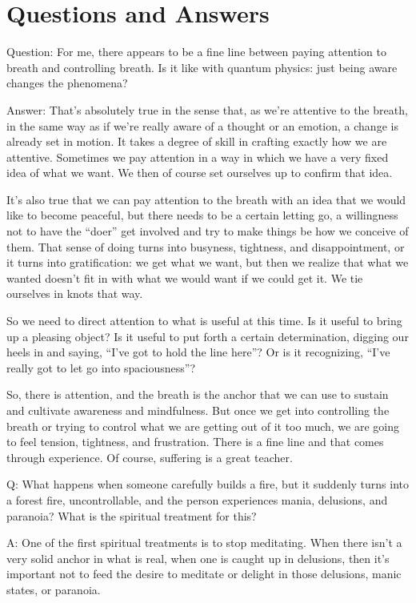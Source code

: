 \chapter{Questions and Answers}

\qaspace
Question: For me, there appears to be a fine line between paying
attention to breath and controlling breath. Is it like with quantum
physics: just being aware changes the phenomena?

\qaspace
Answer: That’s absolutely true in the sense that, as we’re attentive to
the breath, in the same way as if we’re really aware of a thought or an
emotion, a change is already set in motion. It takes a degree of skill
in crafting exactly how we are attentive. Sometimes we pay attention in
a way in which we have a very fixed idea of what we want. We then of
course set ourselves up to confirm that idea.

It’s also true that we can pay attention to the breath with an idea that
we would like to become peaceful, but there needs to be a certain
letting go, a willingness not to have the “doer” get involved and try to
make things be how we conceive of them. That sense of doing turns into
busyness, tightness, and disappointment, or it turns into gratification:
we get what we want, but then we realize that what we wanted doesn’t fit
in with what we would want if we could get it. We tie ourselves in knots
that way.

So we need to direct attention to what is useful at this time. Is it
useful to bring up a pleasing object? Is it useful to put forth a
certain determination, digging our heels in and saying, “I’ve got to
hold the line here”? Or is it recognizing, “I’ve really got to let go
into spaciousness”?

So, there is attention, and the breath is the anchor that we can use to
sustain and cultivate awareness and mindfulness. But once we get into
controlling the breath or trying to control what we are getting out of
it too much, we are going to feel tension, tightness, and frustration.
There is a fine line and that comes through experience. Of course,
suffering is a great teacher.

\qaspace
Q: What happens when someone carefully builds a fire, but it suddenly
turns into a forest fire, uncontrollable, and the person experiences
mania, delusions, and paranoia? What is the spiritual treatment for
this?

\qaspace
A: One of the first spiritual treatments is to stop meditating. When
there isn’t a very solid anchor in what is real, when one is caught up
in delusions, then it’s important not to feed the desire to meditate or
delight in those delusions, manic states, or paranoia.

